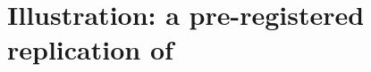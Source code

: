 \section{Illustration: a pre-registered replication of \texorpdfstring{\citet{clark2015macroeconomic}}{Clark and Ravazzolo (2015)}}\label{sec:replication}\label{sec:cr}
%
%
\newsavebox{\crheadlinebox}%

